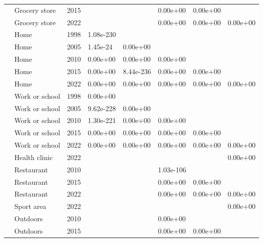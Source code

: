 \documentclass[preprint, 3p,
authoryear]{elsarticle} %
\begin{document}
\begin{table}
{\begin{tabular}[t]{llllllll}
 & Grocery store & 2015 &  &  & 0.00e+00 & 0.00e+00 & \\

 & Grocery store & 2022 &  &  & 0.00e+00 & 0.00e+00 & 0.00e+00\\

 & Home & 1998 & 1.08e-230 &  &  &  & \\

 & Home & 2005 & 1.45e-24 & 0.00e+00 &  &  & \\

 & Home & 2010 & 0.00e+00 & 0.00e+00 & 0.00e+00 &  & \\

 & Home & 2015 & 0.00e+00 & 8.44e-236 & 0.00e+00 & 0.00e+00 & \\

 & Home & 2022 & 0.00e+00 & 0.00e+00 & 0.00e+00 & 0.00e+00 & 0.00e+00\\

 & Work or school & 1998 & 0.00e+00 &  &  &  & \\

 & Work or school & 2005 & 9.62e-228 & 0.00e+00 &  &  & \\

 & Work or school & 2010 & 1.30e-221 & 0.00e+00 & 0.00e+00 &  & \\

 & Work or school & 2015 & 0.00e+00 & 0.00e+00 & 0.00e+00 & 0.00e+00 & \\

 & Work or school & 2022 & 0.00e+00 & 0.00e+00 & 0.00e+00 & 0.00e+00 & 0.00e+00\\

 & Health clinic & 2022 &  &  &  &  & 0.00e+00\\

 & Restaurant & 2010 &  &  & 1.03e-106 &  & \\

 & Restaurant & 2015 &  &  & 0.00e+00 & 0.00e+00 & \\

 & Restaurant & 2022 &  &  & 0.00e+00 & 0.00e+00 & 0.00e+00\\

 & Sport area & 2022 &  &  &  &  & 0.00e+00\\

 & Outdoors & 2010 &  &  & 0.00e+00 &  & \\

 & Outdoors & 2015 &  &  & 0.00e+00 & 0.00e+00 & \\


\end{tabular}}
\end{table}
\end{document}
